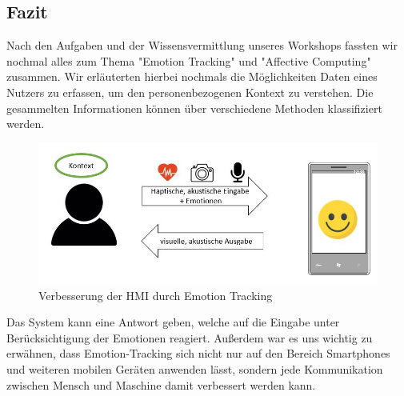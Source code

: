 \subsection{Fazit}

Nach den Aufgaben und der Wissensvermittlung unseres Workshops fassten wir nochmal alles zum Thema "Emotion Tracking" und "Affective Computing" zusammen. Wir erläuterten hierbei nochmals die Möglichkeiten Daten eines Nutzers zu erfassen, um den personenbezogenen Kontext zu verstehen. Die gesammelten Informationen können über verschiedene Methoden klassifiziert werden.

\begin{figure}[!h]
	\centering
	\includegraphics[width=0.9\linewidth]{Pictures/Fazit_Grafik}
	\caption[Verbesserung der MMI durch Emotion Tracking]{Verbesserung der \ac{HMI} durch Emotion Tracking}
	\label{fig:fazitgrafik}
\end{figure}

Das System kann eine Antwort geben, welche auf die Eingabe unter Berücksichtigung der Emotionen reagiert. Außerdem war es uns wichtig zu erwähnen, dass Emotion-Tracking sich nicht nur auf den Bereich Smartphones und weiteren mobilen Geräten anwenden lässt, sondern jede Kommunikation zwischen Mensch und Maschine damit verbessert werden kann. 
